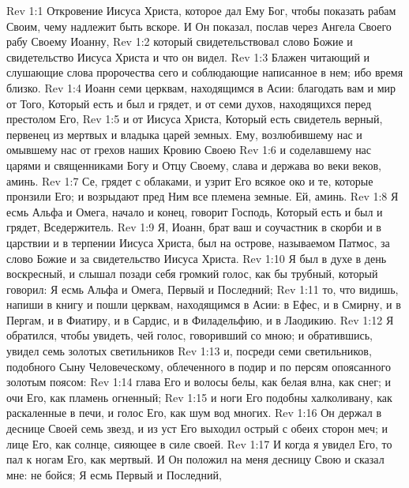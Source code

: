\vs Rev 1:1 Откровение Иисуса Христа, которое дал Ему Бог, чтобы показать рабам Своим, чему надлежит быть вскоре. И Он показал, послав  через Ангела Своего рабу Своему Иоанну,
\vs Rev 1:2 который свидетельствовал слово Божие и свидетельство Иисуса Христа и что он видел.
\vs Rev 1:3 Блажен читающий и слушающие слова пророчества сего и соблюдающие написанное в нем; ибо время близко.
\rsbpar\vs Rev 1:4 Иоанн семи церквам, находящимся в Асии: благодать вам и мир от Того, Который есть и был и грядет, и от семи духов, находящихся перед престолом Его,
\vs Rev 1:5 и от Иисуса Христа, Который есть свидетель верный, первенец из мертвых и владыка царей земных. Ему, возлюбившему нас и омывшему нас от грехов наших Кровию Своею
\vs Rev 1:6 и соделавшему нас царями и священниками Богу и Отцу Своему, слава и держава во веки веков, аминь.
\vs Rev 1:7 Се, грядет с облаками, и узрит Его всякое око и те, которые пронзили Его; и возрыдают пред Ним все племена земные. Ей, аминь.
\rsbpar\vs Rev 1:8 Я есмь Альфа и Омега, начало и конец, говорит Господь, Который есть и был и грядет, Вседержитель.
\rsbpar\vs Rev 1:9 Я, Иоанн, брат ваш и соучастник в скорби и в царствии и в терпении Иисуса Христа, был на острове, называемом Патмос, за слово Божие и за свидетельство Иисуса Христа.
\vs Rev 1:10 Я был в духе в день воскресный, и слышал позади себя громкий голос, как бы трубный, который говорил: Я есмь Альфа и Омега, Первый и Последний;
\vs Rev 1:11 то, что видишь, напиши в книгу и пошли церквам, находящимся в Асии: в Ефес, и в Смирну, и в Пергам, и в Фиатиру, и в Сардис, и в Филадельфию, и в Лаодикию.
\vs Rev 1:12 Я обратился, чтобы увидеть, чей голос, говоривший со мною; и обратившись, увидел семь золотых светильников
\vs Rev 1:13 и, посреди семи светильников, подобного Сыну Человеческому, облеченного в подир и по персям опоясанного золотым поясом:
\vs Rev 1:14 глава Его и волосы белы, как белая влна, как снег; и очи Его, как пламень огненный;
\vs Rev 1:15 и ноги Его подобны халколивану, как раскаленные в печи, и голос Его, как шум вод многих.
\vs Rev 1:16 Он держал в деснице Своей семь звезд, и из уст Его выходил острый с обеих сторон меч; и лице Его, как солнце, сияющее в силе своей.
\vs Rev 1:17 И когда я увидел Его, то пал к ногам Его, как мертвый. И Он положил на меня десницу Свою и сказал мне: не бойся; Я есмь Первый и Последний,
